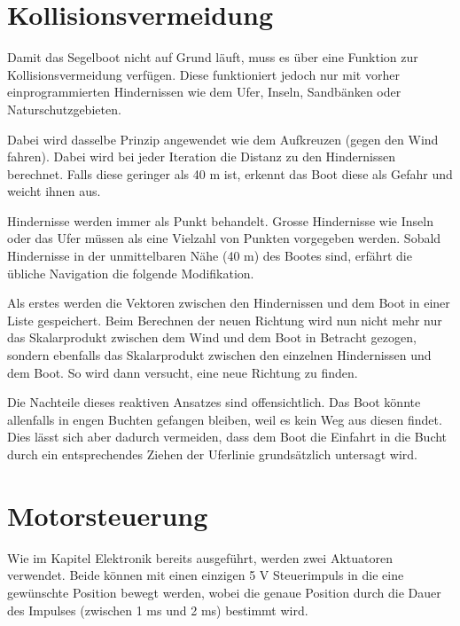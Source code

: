 \section{Kollisionsvermeidung}
Damit das Segelboot nicht auf Grund läuft, muss es über eine Funktion zur Kollisionsvermeidung verfügen. Diese funktioniert jedoch nur mit vorher einprogrammierten Hindernissen wie dem Ufer, Inseln, Sandbänken oder Naturschutzgebieten. 

Dabei wird dasselbe Prinzip angewendet wie dem Aufkreuzen (gegen den Wind fahren). Dabei wird bei jeder Iteration die Distanz zu den Hindernissen berechnet. Falls diese geringer als 40 m ist, erkennt das Boot diese als Gefahr und weicht ihnen aus.  

Hindernisse werden immer als Punkt behandelt. Grosse Hindernisse wie Inseln oder das Ufer müssen als eine Vielzahl von Punkten vorgegeben werden. Sobald Hindernisse in der unmittelbaren Nähe (40 m) des Bootes sind, erfährt die übliche Navigation die folgende Modifikation.

Als erstes werden die Vektoren zwischen den Hindernissen und dem Boot in einer Liste gespeichert. Beim Berechnen der neuen Richtung wird nun nicht mehr nur das Skalarprodukt zwischen dem Wind und dem Boot in Betracht gezogen, sondern ebenfalls das Skalarprodukt zwischen den einzelnen Hindernissen und dem Boot. So wird dann versucht, eine neue Richtung zu finden.

Die Nachteile dieses reaktiven Ansatzes sind offensichtlich. Das Boot könnte allenfalls in engen Buchten gefangen bleiben, weil es kein Weg aus diesen findet. Dies lässt sich aber dadurch vermeiden, dass dem Boot die Einfahrt in die Bucht durch ein entsprechendes Ziehen der Uferlinie grundsätzlich untersagt wird. 
\section{Motorsteuerung}
Wie im Kapitel Elektronik bereits ausgeführt, werden zwei Aktuatoren verwendet. Beide können mit einen einzigen 5 V Steuerimpuls in die eine gewünschte Position bewegt werden, wobei die genaue Position durch die Dauer des Impulses (zwischen 1 ms und 2 ms) bestimmt wird. 
